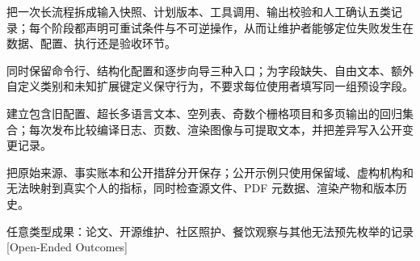 
\begin{resumelist}
  \item {}%
    把一次长流程拆成输入快照、计划版本、工具调用、输出校验和人工确认五类记录；每个阶段都声明可重试条件与不可逆操作，从而让维护者能够定位失败发生在数据、配置、执行还是验收环节。
  \item {}同时保留命令行、结构化配置和逐步向导三种入口；为字段缺失、自由文本、额外自定义类别和未知扩展键定义保守行为，不要求每位使用者填写同一组预设字段。
  \item {}建立包含旧配置、超长多语言文本、空列表、奇数个栅格项目和多页输出的回归集合；每次发布比较编译日志、页数、渲染图像与可提取文本，并把差异写入公开变更记录。
  \item {}把原始来源、事实账本和公开措辞分开保存；公开示例只使用保留域、虚构机构和无法映射到真实个人的指标，同时检查源文件、PDF 元数据、渲染产物和版本历史。
\end{resumelist}

\resumesection
  {任意类型成果：论文、开源维护、社区照护、餐饮观察与其他无法预先枚举的记录}
  [Open-Ended Outcomes]


